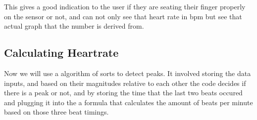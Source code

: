 \documentclass{article}
\begin{document}
\begin{center}
\end{center}
This gives a good indication to the user if they are seating their finger properly on the sensor or not, and can not only see that heart rate in bpm but see that actual graph that the number is derived from.
\newpage
\subsection{Calculating Heartrate}
Now we will use a algorithm of sorts to detect peaks. It involved storing the data inputs, and based on their magnitudes relative to each other the code decides if there is a peak or not, and by storing the time that the last two beats occured and plugging it into the a formula that calculates the amount of beats per minute based on those three beat timings.
\end{document}
